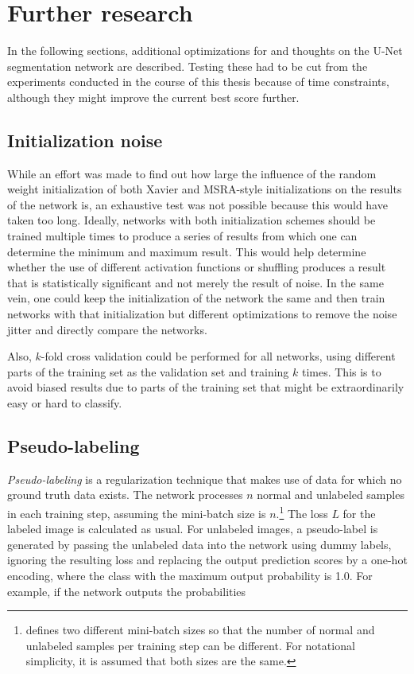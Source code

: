 \chapter {Further research}
\label{chap:futurework}

In the following sections, additional optimizations for and thoughts on the U-Net segmentation network are described. Testing these had to be cut from the experiments conducted in the course of this thesis because of time constraints, although they might improve the current best score further.

\section {Initialization noise}

While an effort was made to find out how large the influence of the random weight initialization of both Xavier and MSRA-style initializations on the results of the network is, an exhaustive test was not possible because this would have taken too long. Ideally, networks with both initialization schemes should be trained multiple times to produce a series of results from which one can determine the minimum and maximum result. This would help determine whether the use of different activation functions or shuffling produces a result that is statistically significant and not merely the result of noise. In the same vein, one could keep the initialization of the network the same and then train networks with that initialization but different optimizations to remove the noise jitter and directly compare the networks.

Also, $k$-fold cross validation could be performed for all networks, using different parts of the training set as the validation set and training $k$ times. This is to avoid biased results due to parts of the training set that might be extraordinarily easy or hard to classify.


	\section {Pseudo-labeling}
\label{subsec:pseudo_label}

\textit{Pseudo-labeling} \cite{pseudo_label} is a regularization technique that makes use of data for which no ground truth data exists. The network processes $n$ normal and unlabeled samples in each training step, assuming the mini-batch size is $n$.\footnote{\cite{pseudo_label} defines two different mini-batch sizes so that the number of normal and unlabeled samples per training step can be different. For notational simplicity, it is assumed that both sizes are the same.} The loss $L$ for the labeled image is calculated as usual. For unlabeled images, a pseudo-label is generated by passing the unlabeled data into the network using dummy labels, ignoring the resulting loss and replacing the output prediction scores by a one-hot encoding, where the class with the maximum output probability is 1.0. For example, if the network outputs the probabilities 

